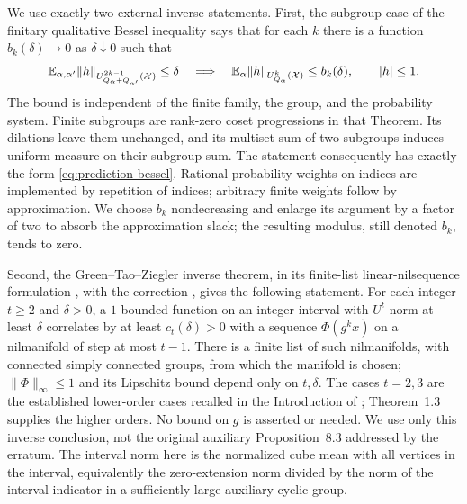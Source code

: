 We use exactly two external inverse statements.  First, the subgroup
case of the finitary qualitative Bessel inequality
\cite[Theorem~1.23]{TaoZiegler} says that for each $k$ there is a
function $b_k(\delta)\to0$ as $\delta\downarrow0$ such that
\begin{equation}\label{eq:prediction-bessel}
 \mathbb E_{\alpha,\alpha'}
 \|h\|_{U^{2k-1}_{Q_\alpha+Q_{\alpha'}}(\mathcal X)}\leq\delta
 \quad\Longrightarrow\quad
 \mathbb E_\alpha\|h\|_{U^k_{Q_\alpha}(\mathcal X)}\leq b_k(\delta),
 \qquad |h|\leq1.
\end{equation}
The bound is independent of the finite family, the group, and the
probability system.  Finite subgroups are rank-zero coset
progressions in that Theorem.  Its dilations leave them unchanged,
and its multiset sum of two subgroups induces uniform measure on
their subgroup sum.  The statement consequently has exactly the
form \eqref{eq:prediction-bessel}.  Rational probability weights on
indices are implemented by repetition of indices; arbitrary finite
weights follow by approximation.  We choose $b_k$ nondecreasing and
enlarge its argument by a factor of two to absorb the approximation
slack; the resulting modulus, still denoted $b_k$, tends to zero.

Second, the Green--Tao--Ziegler inverse theorem, in its finite-list
linear-nilsequence formulation
\cite[Conjecture~1.2 and Theorem~1.3]{GTZ}, with the correction
\cite{GTZErratum}, gives the following statement.  For each integer
$t\geq2$ and $\delta>0$, a $1$-bounded function on an integer interval
with $U^t$ norm at least $\delta$ correlates by at least
$c_t(\delta)>0$ with a sequence $\Phi(g^kx)$ on a nilmanifold of
step at most $t-1$.  There is a finite list of such nilmanifolds,
with connected simply connected groups, from which the manifold is
chosen; $\|\Phi\|_\infty\leq1$ and its Lipschitz bound depend only on
$t,\delta$.  The cases $t=2,3$ are the established lower-order
cases recalled in the Introduction of \cite{GTZ}; Theorem~1.3 supplies
the higher orders.  No bound on $g$ is asserted or needed.
We use only this inverse conclusion, not the original auxiliary
Proposition~8.3 addressed by the erratum.  The interval norm here is
the normalized cube mean with all vertices in the interval, equivalently
the zero-extension norm divided by the norm of the interval indicator
in a sufficiently large auxiliary cyclic group.

